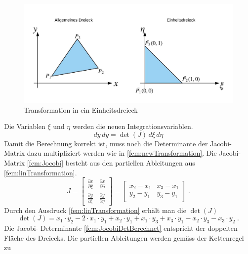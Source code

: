 \begin{figure}[h!]
	\centering
	\includegraphics[scale=0.8]{papers/fem/Images/Dreiecke.jpeg}
	\caption{Transformation in ein Einheitsdreieck}
	\label{fig:TransformationEinheitsdreieckBild}
\end{figure}
Die Variablen $\xi$ und $\eta$ werden die neuen Integrationsvariablen.
\begin{equation}
			dy \, dy = \det(J) \, d\xi \, d\eta
			\label{fem:newTransformation}
\end{equation}
Damit die Berechnung korrekt ist, muss noch die Determinante der Jacobi- Matrix dazu  multipliziert werden wie in \eqref{fem:newTransformation}. Die Jacobi- Matrix \eqref{fem:Jocobi} besteht aus den partiellen Ableitungen aus \eqref{fem:linTransformation}.  
\begin{equation}
J %
=
\begin{bmatrix}
    \frac{\partial x}{\partial \xi} &  \frac{\partial x}{\partial \eta}     \\
   \frac{\partial y}{\partial \xi}  &  \frac{\partial y}{\partial \eta}     
\end{bmatrix}
= 
\begin{bmatrix}
    x_2 - x_1  &  x_3 -x_1      \\
    y_2 - y_1  &  y_3 - y_1      
\end{bmatrix} \; .
	\label{fem:Jocobi}
\end{equation}
Durch den Ausdruck \eqref{fem:linTransformation} erhält man die $\det(J)$
\begin{equation}
	\det(J) = x_1 \cdot y_2 - 2 \cdot x_1 \cdot y_1 + x_2 \cdot y_1 + x_1\cdot y_3 + x_3 \cdot y_1 - x_2 \cdot y_3 - x_3 \cdot y_2 \; .
	\label{fem:JocobiDetBerechnet}
\end{equation}
Die Jacobi- Determinante \eqref{fem:JocobiDetBerechnet} entspricht der doppelten Fläche des Dreiecks. Die partiellen Ableitungen werden gemäss der Kettenregel zu 
